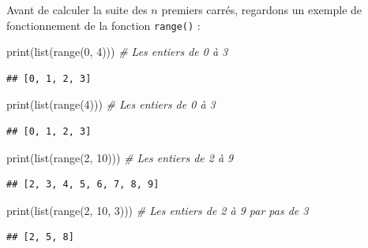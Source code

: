 \documentclass[12pt,]{book}
\newenvironment{Shaded}{\begin{snugshade}}{\end{snugshade}}
\newcommand{\DecValTok}[1]{\textcolor[rgb]{0.00,0.00,0.81}{#1}}
\newcommand{\CommentTok}[1]{\textcolor[rgb]{0.56,0.35,0.01}{\textit{#1}}}
\newcommand{\BuiltInTok}[1]{#1}
\newcommand{\NormalTok}[1]{#1}
\numberwithin{equation}{section}
\numberwithin{countremarque}{section}
\begin{document}
Avant de calculer la suite des \(n\) premiers carrés, regardons un
exemple de fonctionnement de la fonction \texttt{range()} :

\begin{Shaded}
\begin{Highlighting}[]
\BuiltInTok{print}\NormalTok{(}\BuiltInTok{list}\NormalTok{(}\BuiltInTok{range}\NormalTok{(}\DecValTok{0}\NormalTok{, }\DecValTok{4}\NormalTok{))) }\CommentTok{# Les entiers de 0 à 3}
\end{Highlighting}
\end{Shaded}

\begin{lstlisting}
## [0, 1, 2, 3]
\end{lstlisting}

\begin{Shaded}
\begin{Highlighting}[]
\BuiltInTok{print}\NormalTok{(}\BuiltInTok{list}\NormalTok{(}\BuiltInTok{range}\NormalTok{(}\DecValTok{4}\NormalTok{))) }\CommentTok{# Les entiers de 0 à 3}
\end{Highlighting}
\end{Shaded}

\begin{lstlisting}
## [0, 1, 2, 3]
\end{lstlisting}

\begin{Shaded}
\begin{Highlighting}[]
\BuiltInTok{print}\NormalTok{(}\BuiltInTok{list}\NormalTok{(}\BuiltInTok{range}\NormalTok{(}\DecValTok{2}\NormalTok{, }\DecValTok{10}\NormalTok{))) }\CommentTok{# Les entiers de 2 à 9}
\end{Highlighting}
\end{Shaded}

\begin{lstlisting}
## [2, 3, 4, 5, 6, 7, 8, 9]
\end{lstlisting}

\begin{Shaded}
\begin{Highlighting}[]
\BuiltInTok{print}\NormalTok{(}\BuiltInTok{list}\NormalTok{(}\BuiltInTok{range}\NormalTok{(}\DecValTok{2}\NormalTok{, }\DecValTok{10}\NormalTok{, }\DecValTok{3}\NormalTok{))) }\CommentTok{# Les entiers de 2 à 9 par pas de 3}
\end{Highlighting}
\end{Shaded}

\begin{lstlisting}
## [2, 5, 8]
\end{lstlisting}
\end{document}
